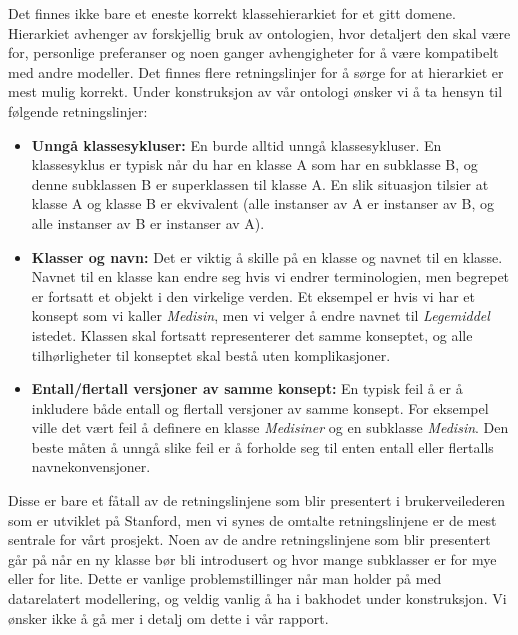 Det finnes ikke bare et eneste korrekt klassehierarkiet for et gitt domene. Hierarkiet avhenger av forskjellig bruk av ontologien, hvor detaljert den skal være for, personlige preferanser og noen ganger avhengigheter for å være kompatibelt med andre modeller. Det finnes flere retningslinjer for å sørge for at hierarkiet er mest mulig korrekt. Under konstruksjon av vår ontologi ønsker vi å ta hensyn til følgende retningslinjer: \\
\begin{itemize}
\item \textbf{Unngå klassesykluser:} En burde alltid unngå klassesykluser. En klassesyklus er typisk når du har en klasse A som har en subklasse B, og denne subklassen B er superklassen til klasse A. En slik situasjon tilsier at klasse A og klasse B er ekvivalent (alle instanser av A er instanser av B, og alle instanser av B er instanser av A). 
\item \textbf{Klasser og navn:} Det er viktig å skille på en klasse og navnet til en klasse. Navnet til en klasse kan endre seg hvis vi endrer terminologien, men begrepet er fortsatt et objekt i den virkelige verden. Et eksempel er hvis vi har et konsept som vi kaller \textit{Medisin}, men vi velger å endre navnet til \textit{Legemiddel} istedet. Klassen skal fortsatt representerer det samme konseptet, og alle tilhørligheter til konseptet skal bestå uten komplikasjoner.
\item \textbf{Entall/flertall versjoner av samme konsept:} En typisk feil å er å inkludere både entall og flertall versjoner av samme konsept. For eksempel ville det vært feil å definere en klasse \textit{Medisiner} og en subklasse \textit{Medisin}. Den beste måten å unngå slike feil er å forholde seg til enten entall eller flertalls navnekonvensjoner.
\end{itemize}
Disse er bare et fåtall av de retningslinjene som blir presentert i brukerveilederen som er utviklet på Stanford, men vi synes de omtalte retningslinjene er de mest sentrale for vårt prosjekt. \citep{ontology_101} Noen av de andre retningslinjene som blir presentert går på når en ny klasse bør bli introdusert og hvor mange subklasser er for mye eller for lite. Dette er vanlige problemstillinger når man holder på med datarelatert modellering, og veldig vanlig å ha i bakhodet under konstruksjon. Vi ønsker ikke å gå mer i detalj om dette i vår rapport.  

